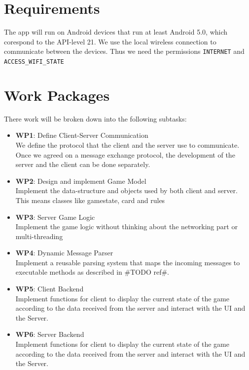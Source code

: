 \documentclass{sig-alternate}
\begin{document}
\section{Requirements}
The app will run on Android devices that run at least Android 5.0, which corespond to the API-level 21. We use the local wireless connection to communicate between the devices. Thus we need the permissions \verb|INTERNET| and \verb|ACCESS_WIFI_STATE|

\section{Work Packages}
There work will be broken down into the following subtasks:

\begin{itemize}
	
        \item {\bf WP1}: Define Client-Server Communication\\
        We define the protocol that the client and the server use to communicate. Once we agreed on a message exchange protocol, the development of the server and the client can be done separately.
        
        \item {\bf WP2}: Design and implement Game Model\\
        Implement the data-structure and objects used by both client and server. This means classes like gamestate, card and rules
        
        \item {\bf WP3}: Server Game Logic\\
        Implement the game logic without thinking about the networking part or multi-threading
        
        \item {\bf WP4}: Dynamic Message Parser\\
		Implement a reusable parsing system that maps the incoming messages to executable methods as described in \#TODO ref\#.
           
        \item {\bf WP5}: Client Backend\\
		Implement functions for client to display the current state of the game according to the data received from the server and interact with the UI and the Server.
		
		\item {\bf WP6}: Server Backend\\
		Implement functions for client to display the current state of the game according to the data received from the server and interact with the UI and the Server.
		

\end{itemize}
\end{document}
